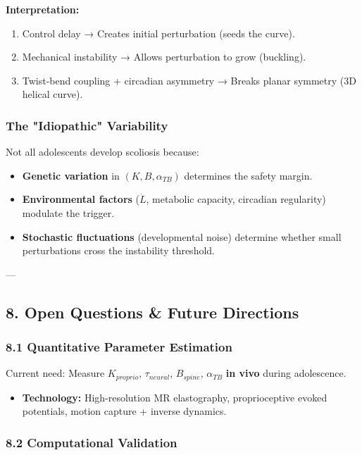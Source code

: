 \documentclass[11pt,a4paper]{article}
\begin{document}
\textbf{Interpretation:}

\begin{enumerate}
\item Control delay → Creates initial perturbation (seeds the curve).
\item Mechanical instability → Allows perturbation to grow (buckling).
\item Twist-bend coupling + circadian asymmetry → Breaks planar symmetry (3D helical curve).
\end{enumerate}

\subsubsection{The "Idiopathic" Variability}

Not all adolescents develop scoliosis because:

\begin{itemize}
\item \textbf{Genetic variation} in $(K, B, \alpha_{TB})$ determines the safety margin.
\item \textbf{Environmental factors} ($\dot{L}$, metabolic capacity, circadian regularity) modulate the trigger.
\item \textbf{Stochastic fluctuations} (developmental noise) determine whether small perturbations cross the instability threshold.
\end{itemize}

---

\subsection{8. Open Questions & Future Directions}

\subsubsection{8.1 Quantitative Parameter Estimation}

Current need: Measure $K_{proprio}$, $\tau_{neural}$, $B_{spine}$, $\alpha_{TB}$ \textbf{in vivo} during adolescence.

\begin{itemize}
\item \textbf{Technology:} High-resolution MR elastography, proprioceptive evoked potentials, motion capture + inverse dynamics.
\end{itemize}

\subsubsection{8.2 Computational Validation}
\end{document}
